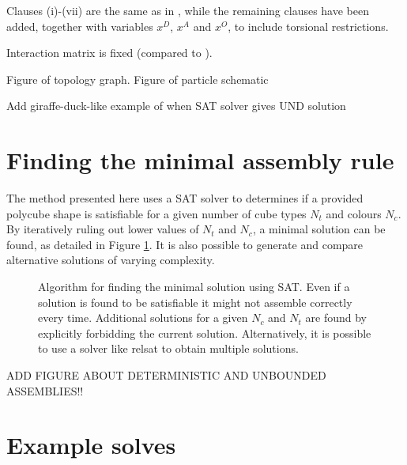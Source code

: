 Clauses (i)-(vii) are the same as in \cite{romano2020designing}, while the remaining clauses have been added, together with variables \(x^D\), \(x^A\) and \(x^O\), to include torsional restrictions.

Interaction matrix is fixed (compared to \cite{romano2020designing}).

Figure of topology graph. Figure of particle schematic

Add giraffe-duck-like example of when SAT solver gives UND solution

\section{Finding the minimal assembly rule}

The method presented here uses a SAT solver to determines if a provided polycube shape is satisfiable for a given number of cube types \(N_t\) and colours \(N_c\). By iteratively ruling out lower values of \(N_t\) and \(N_c\), a minimal solution can be found, as detailed in Figure \ref{fig:sat_alg}. It is also possible to generate and compare alternative solutions of varying complexity.

\begin{figure}
    \centering
    \resizebox{\textwidth}{!}{}
    \caption{Algorithm for finding the minimal solution using SAT. Even if a solution is found to be satisfiable it might not assemble correctly every time. Additional solutions for a given \(N_c\) and \(N_t\) are found by explicitly forbidding the current solution. Alternatively, it is possible to use a solver like relsat to obtain multiple solutions. }
    \label{fig:sat_alg}
\end{figure}

ADD FIGURE ABOUT DETERMINISTIC AND UNBOUNDED ASSEMBLIES!!

\section{Example solves}

  
